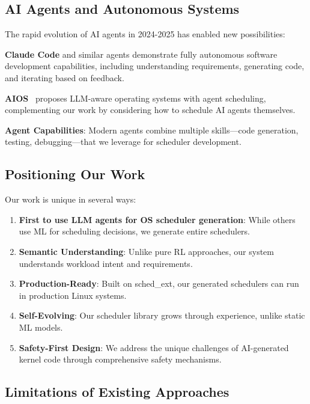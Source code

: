 \subsection{AI Agents and Autonomous Systems}

The rapid evolution of AI agents in 2024-2025 has enabled new possibilities:

\textbf{Claude Code} and similar agents demonstrate fully autonomous software development capabilities, including understanding requirements, generating code, and iterating based on feedback.

\textbf{AIOS}~\cite{mei2024aios} proposes LLM-aware operating systems with agent scheduling, complementing our work by considering how to schedule AI agents themselves.

\textbf{Agent Capabilities}: Modern agents combine multiple skills—code generation, testing, debugging—that we leverage for scheduler development.

\subsection{Positioning Our Work}

Our work is unique in several ways:

\begin{enumerate}
\item \textbf{First to use LLM agents for OS scheduler generation}: While others use ML for scheduling decisions, we generate entire schedulers.

\item \textbf{Semantic Understanding}: Unlike pure RL approaches, our system understands workload intent and requirements.

\item \textbf{Production-Ready}: Built on sched\_ext, our generated schedulers can run in production Linux systems.

\item \textbf{Self-Evolving}: Our scheduler library grows through experience, unlike static ML models.

\item \textbf{Safety-First Design}: We address the unique challenges of AI-generated kernel code through comprehensive safety mechanisms.
\end{enumerate}

\subsection{Limitations of Existing Approaches}

